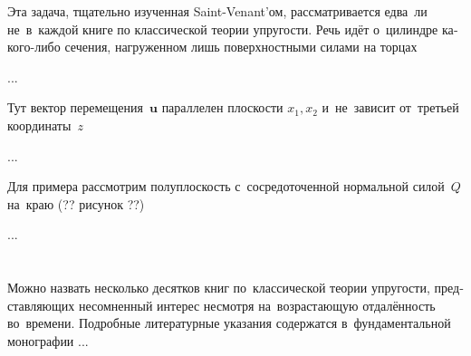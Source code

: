 
\label{para:twistingofrods.saintvenant}

\begin{otherlanguage}{russian}

Эта задача, тщательно изученная Saint\hbox{-\hspace{-0.2ex}}Venant’ом, рассматривается едва~ли не~в~каждой книге по классической теории упругости. Речь идёт о~цилиндре какого\hbox{-}либо сечения, нагруженном лишь поверхностными силами на торцах

...



\end{otherlanguage}



\label{para:planedeformation.linearclassicalelasticity}

\begin{otherlanguage}{russian}

Тут вектор перемещения~$\bm{u}$ параллелен плоскости ${x_1, x_2}$ и~не~зависит от~третьей координаты~$z$

...

Для примера рассмотрим полуплоскость с~сосредоточенной нормальной силой~$Q$ на~краю (?? рисунок ??)

...

\end{otherlanguage}

\vspace{8mm}
\hfill\begin{minipage}[b]{0.95\linewidth}
\fontsize{10}{12}\selectfont

\section*{\wordforbibliography}

\begin{otherlanguage}{russian}

Можно назвать несколько десятков книг по~классической теории упругости, представляющих несомненный интерес несмотря на~возрастающую отдалённость во~времени. Подробные литературные указания содержатся в~фундаментальной монографии ...

\end{otherlanguage}

\end{minipage}
